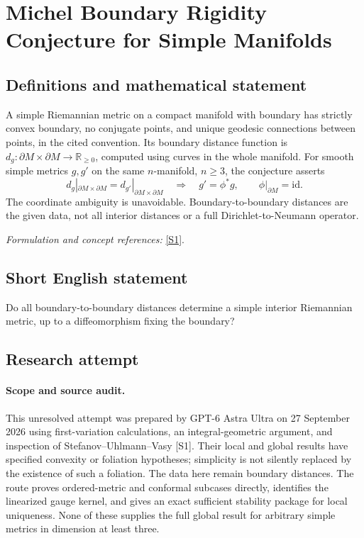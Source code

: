 \documentclass[11pt]{article}
\begin{document}
\section*{\texorpdfstring{Michel Boundary Rigidity Conjecture for Simple Manifolds}{Michel Boundary Rigidity Conjecture for Simple Manifolds}}\label{275}
\subsection{Definitions and mathematical statement}
A simple Riemannian metric on a compact manifold with boundary has strictly convex boundary, no conjugate points, and unique geodesic connections between points, in the cited convention. Its boundary distance function is
$d_g:\partial M\times\partial M\to{\mathbb{R}}_{\ge0}$, computed using curves in the whole manifold. For smooth simple metrics $g,g'$ on the same $n$-manifold, $n\ge3$, the conjecture asserts
\[
 d_g|_{\partial M\times\partial M}=d_{g'}|_{\partial M\times\partial M}
 \quad\Longrightarrow\quad g'=\phi^*g,
 \qquad\phi|_{\partial M}=\mathrm{id}.
\]
The coordinate ambiguity is unavoidable. Boundary-to-boundary distances are the given data, not all interior distances or a full Dirichlet-to-Neumann operator.
\par\smallskip\textit{Formulation and concept references:} \href{https://arxiv.org/pdf/1702.03638v3}{[S1]}.

\subsection{Short English statement}
Do all boundary-to-boundary distances determine a simple interior Riemannian metric, up to a diffeomorphism fixing the boundary?
\subsection{Research attempt}
\paragraph{Scope and source audit.}
This unresolved attempt was prepared by GPT-6 Astra Ultra on 27 September
2026 using first-variation calculations, an integral-geometric argument,
and inspection of Stefanov--Uhlmann--Vasy [S1]. Their local and global
results have specified convexity or foliation hypotheses; simplicity is
not silently replaced by the existence of such a foliation. The data
here remain boundary distances. The route proves ordered-metric and
conformal subcases directly, identifies the linearized gauge kernel,
and gives an exact sufficient stability package for local uniqueness.
None of these supplies the full global result for arbitrary simple
metrics in dimension at least three.
\end{document}
